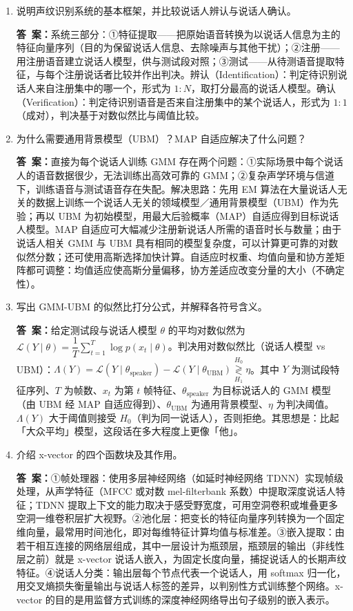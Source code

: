 \documentclass[10.5pt]{ctexart}
\newenvironment{qlist}
  {\begin{enumerate}[label={\sffamily\bfseries\color{accent}\arabic*.},leftmargin=2.4em,labelsep=0.55em,itemsep=0.62em,topsep=0.15em,parsep=0.3em,partopsep=0pt]}
  {\end{enumerate}}
\newcommand{\anslabel}{{\sffamily\bfseries\color{accent}答\ 案：}\hspace{0.35em}}
\newcommand{\ansL}[1]{\par\vspace{3.6\baselineskip}\begin{ansbox}\anslabel #1\end{ansbox}}
\begin{document}
\begin{qlist}

\item 说明声纹识别系统的基本框架，并比较说话人辨认与说话人确认。
\ansL{系统三部分：①特征提取——把原始语音转换为以说话人信息为主的特征向量序列（目的为保留说话人信息、去除噪声与其他干扰）；②注册——用注册语音建立说话人模型，供与测试段对照；③测试——从待测语音提取特征，与每个注册说话者比较并作出判决。辨认（Identification）：判定待识别说话人来自注册集中的哪一个，形式为 $1:N$，取打分最高的说话人模型。确认（Verification）：判定待识别语音是否来自注册集中的某个说话人，形式为 $1:1$（成对），判决基于对数似然比与阈值比较。}

\item 为什么需要通用背景模型（UBM）？MAP 自适应解决了什么问题？
\ansL{直接为每个说话人训练 GMM 存在两个问题：①实际场景中每个说话人的语音数据很少，无法训练出高效可靠的 GMM；②复杂声学环境与信道下，训练语音与测试语音存在失配。解决思路：先用 EM 算法在大量说话人无关的数据上训练一个说话人无关的领域模型／通用背景模型（UBM）作为先验；再以 UBM 为初始模型，用最大后验概率（MAP）自适应得到目标说话人模型。MAP 自适应可大幅减少注册新说话人所需的语音时长与数量；由于说话人相关 GMM 与 UBM 具有相同的模型复杂度，可以计算更可靠的对数似然分数；还可使用高斯选择加快计算。自适应时权重、均值向量和协方差矩阵都可调整：均值适应使高斯分量偏移，协方差适应改变分量的大小（不确定性）。}

\item 写出 GMM-UBM 的似然比打分公式，并解释各符号含义。
\ansL{给定测试段与说话人模型 $\theta$ 的平均对数似然为 $\mathcal L(Y\mid\theta)=\dfrac{1}{T}\sum_{t=1}^{T}\log p(x_t\mid\theta)$。判决用对数似然比（说话人模型 vs UBM）：$\Lambda(Y)=\mathcal L(Y\mid\theta_{\text{speaker}})-\mathcal L(Y\mid\theta_{\text{UBM}})\underset{H_1}{\overset{H_0}{\gtrless}}\eta$。其中 $Y$ 为测试段特征序列、$T$ 为帧数、$x_t$ 为第 $t$ 帧特征、$\theta_{\text{speaker}}$ 为目标说话人的 GMM 模型（由 UBM 经 MAP 自适应得到）、$\theta_{\text{UBM}}$ 为通用背景模型、$\eta$ 为判决阈值。$\Lambda(Y)$ 大于阈值则接受 $H_0$（判为同一说话人），否则拒绝。其思想是：比起「大众平均」模型，这段话在多大程度上更像「他」。}

\item 介绍 x-vector 的四个函数块及其作用。
\ansL{①帧处理器：使用多层神经网络（如延时神经网络 TDNN）实现帧级处理，从声学特征（MFCC 或对数 mel-filterbank 系数）中提取深度说话人特征；TDNN 提取上下文的能力取决于感受野宽度，可用空洞卷积或堆叠更多空洞一维卷积层扩大视野。②池化层：把变长的特征向量序列转换为一个固定维向量，最常用时间池化，即对每维特征计算均值与标准差。③嵌入提取：由若干相互连接的网络层组成，其中一层设计为瓶颈层，瓶颈层的输出（非线性层之前）就是 x-vector 说话人嵌入，为固定长度向量，捕捉说话人的长期声纹特征。④说话人分类：输出层每个节点代表一个说话人，用 softmax 归一化，用交叉熵损失衡量输出与说话人标签的差异，以判别性方式训练整个网络。x-vector 的目的是用监督方式训练的深度神经网络导出句子级别的嵌入表示。}

\end{qlist}
\end{document}
